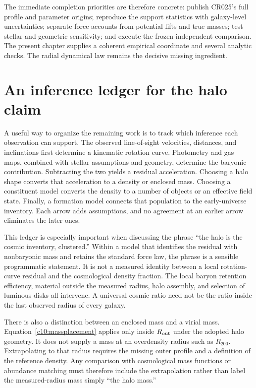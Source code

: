 The immediate completion priorities are therefore concrete: publish CR025's full profile and parameter origins; reproduce the support statistics with galaxy-level uncertainties; separate force accounts from potential lifts and true masses; test stellar and geometric sensitivity; and execute the frozen independent comparison. The present chapter supplies a coherent empirical coordinate and several analytic checks. The radial dynamical law remains the decisive missing ingredient.

\section{An inference ledger for the halo claim}

A useful way to organize the remaining work is to track which inference each observation can support. The observed line-of-sight velocities, distances, and inclinations first determine a kinematic rotation curve. Photometry and gas maps, combined with stellar assumptions and geometry, determine the baryonic contribution. Subtracting the two yields a residual acceleration. Choosing a halo shape converts that acceleration to a density or enclosed mass. Choosing a constituent model converts the density to a number of objects or an effective field state. Finally, a formation model connects that population to the early-universe inventory. Each arrow adds assumptions, and no agreement at an earlier arrow eliminates the later ones.

This ledger is especially important when discussing the phrase ``the halo is the cosmic inventory, clustered.'' Within a model that identifies the residual with nonbaryonic mass and retains the standard force law, the phrase is a sensible programmatic statement. It is not a measured identity between a local rotation-curve residual and the cosmological density fraction. The local baryon retention efficiency, material outside the measured radius, halo assembly, and selection of luminous disks all intervene. A universal cosmic ratio need not be the ratio inside the last observed radius of every galaxy.

There is also a distinction between an enclosed mass and a virial mass. Equation~\eqref{c10:massplacement} applies only inside $R_{\rm out}$ under the adopted halo geometry. It does not supply a mass at an overdensity radius such as $R_{200}$. Extrapolating to that radius requires the missing outer profile and a definition of the reference density. Any comparison with cosmological mass functions or abundance matching must therefore include the extrapolation rather than label the measured-radius mass simply ``the halo mass.''

